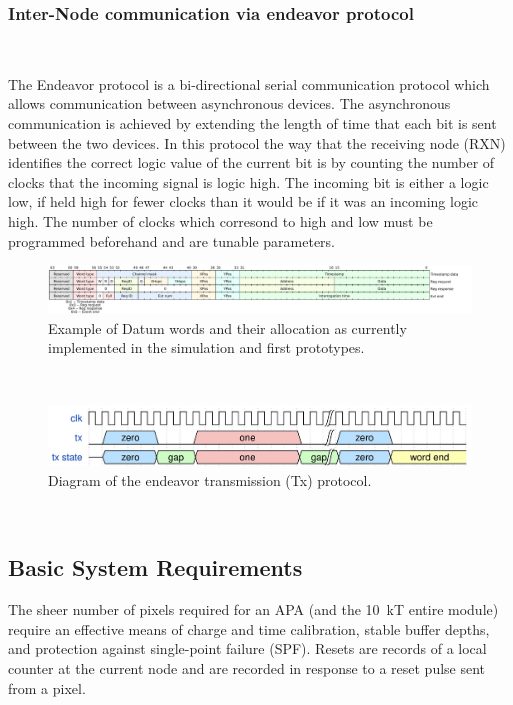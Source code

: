 \subsubsection{Inter-Node communication via endeavor protocol}
~\label{sect:endeavor}

The Endeavor protocol is a bi-directional serial communication protocol which allows communication between asynchronous devices.
The asynchronous communication is achieved by extending the length of time that each bit is sent between the two devices.
In this protocol the way that the receiving node (RXN) identifies the correct logic value of the current bit is by counting the number of clocks that the incoming signal is logic high.
The incoming bit is either a logic low, if held high for fewer clocks than it would be if it was an incoming logic high.
The number of clocks which corresond to high and low must be programmed beforehand and are tunable parameters.

\begin{figure}[]
\centering
\includegraphics[width=\textwidth]{images/qpix_word_format.pdf}
\caption{Example of Datum words and their allocation as currently implemented in the simulation and first prototypes.}
\end{figure}~\label{fig:datum}

\begin{figure}[]
\centering
\includegraphics[width=\textwidth]{images/endeavor_protocol.jpg}
\caption{Diagram of the endeavor transmission (Tx) protocol.}
\end{figure}~\label{fig:endeavor}

\subsection{Basic System Requirements}

The sheer number of pixels required for an APA (and the 10~\unit{kT} entire module) require an effective means of charge and time calibration, stable buffer depths, and protection against single-point failure (SPF).
Resets are records of a local counter at the current node and are recorded in response to a reset pulse sent from a pixel.

